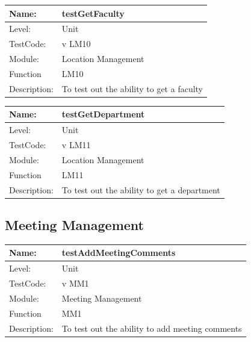 \documentclass[12pt]{article}
\begin{document}
\begin{center}
\begin{tabular}{|l|p{12cm}|}
\hline

 Name: & testGetFaculty \\
 \hline
Level: & Unit \\
\hline
TestCode: & v LM10 \\
\hline
Module:& Location Management \\
\hline
Function & LM10 \\
\hline
Description: & To test out the ability to get a faculty \\
\hline
\end{tabular}
\end{center}

\begin{center}
\begin{tabular}{|l|p{12cm}|}
\hline

 Name: & testGetDepartment \\
 \hline
Level: & Unit \\
\hline
TestCode: & v LM11 \\
\hline
Module:& Location Management \\
\hline
Function & LM11 \\
\hline
Description: & To test out the ability to get a department \\
\hline
\end{tabular}
\end{center}

\subsection{Meeting Management}
\begin{center}
\begin{tabular}{|l|p{12cm}|}
\hline

 Name: & testAddMeetingComments  \\
\hline
Level: & Unit \\
\hline
TestCode: & v MM1 \\
\hline
Module:& Meeting Management \\
\hline
Function & MM1 \\
\hline
Description: & To test out the ability to add meeting comments  \\
\hline

\end{tabular}
\end{center}
\end{document}
